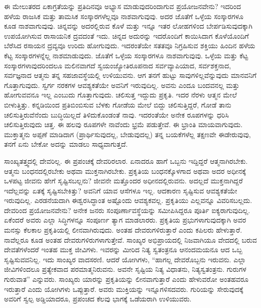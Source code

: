 ಈ ಮೇಲುತರದ ಏಕಾಗ್ರತೆಯನ್ನು ಪ್ರತಿದಿನವೂ ಅಭ್ಯಾಸ ಮಾಡುವುದರಿಂದಾಗುವ ಪ್ರಯೋಜನವೇನು? ಇದರಿಂದ ಹಳೆಯ ರಾಜಸಿಕ ಮತ್ತು ತಾಮಸಿಕ ಸಂಸ್ಕಾರಗಳೆಲ್ಲವೂ ನಾಶವಾಗುವುವು. ಅದರ ಜೊತೆಗೆ ಒಳ್ಳೆಯ ಸಂಸ್ಕಾರಗಳೂ ಕೂಡ ನಾಶವಾಗುವುವು. ಚಿನ್ನವನ್ನು ಅದರಲ್ಲಿರುವ ಕೊಳೆ ಮತ್ತು ಇನ್ನೂ ಇತರ ಲೋಹಗಳಿಂದ ಬೇರ್ಪಡಿಸುವುದಕ್ಕಾಗಿ ಉಪಯೋಗಿಸುವ ರಾಸಾಯನಿಕ ದ್ರವದಂತೆ ಇದು. ಚಿನ್ನದ ಅದುರನ್ನು ಇದರೊಂದಿಗೆ ಕಾಯಿಸಿದಾಗ ಕೊಳೆಯೊಂದಿಗೆ ಬೆರೆಸಿದ ರಸಾಯನ ದ್ರವ್ಯವೂ ಉರಿದು ಹೋಗುವುದು. ಇದರಂತೆಯೇ ಸತತವೂ ನಿಗ್ರಹಿಸುವ ಶಕ್ತಿಯು ಹಿಂದಿನ ಹಳೆಯ ಕೆಟ್ಟ ಸಂಸ್ಕಾರಗಳನ್ನೆಲ್ಲ ನಾಶಮಾಡುವುದು. ಜೊತೆಗೆ ಒಳ್ಳೆಯ ಸಂಸ್ಕಾರಗಳೂ ನಾಶವಾಗುವುವು. ಒಳ್ಳೆಯ ಮತ್ತು ಕೆಟ್ಟ ಸಂಸ್ಕಾರಗಳಾವುದರಿಂದಲೂ ಮಲಿನವಾಗದೆ ಸ್ವಯಂಜ್ಯೋತಿರೂಪನಾದ ಸರ್ವವ್ಯಾಪಿಯಾದ, ಸರ್ವಶಕ್ತನಾದ, ಸರ್ವಜ್ಞನಾದ ಆತ್ಮನು ತನ್ನ ಸಹಜಾವಸ್ಥೆಯಲ್ಲಿ ಉಳಿಯುವನು. ಆಗ ತನಗೆ ಹುಟ್ಟು ಸಾವುಗಳಿಲ್ಲವೆನ್ನುವುದು ಮಾನವನಿಗೆ ಗೊತ್ತಾಗುವುದು. ಸ್ವರ್ಗ ನರಕಗಳ ಆವಶ್ಯಕತೆಯೇ ಅವನಿಗೆ ಇರುವುದಿಲ್ಲ. ಅವನು ಎಂದೂ ಬಂದವನಲ್ಲ ಮತ್ತು ಹೋಗುವವನೂ ಇಲ್ಲ ಎಂಬುದು ಗೊತ್ತಾಗುವುದು. ಚಲಿಸುತ್ತ ಇದ್ದುದು ಪ್ರಕೃತಿ. ಇದರ ನೆರಳು ಆತ್ಮನ ಮೇಲೆ ಬೀಳುತ್ತಿತ್ತು. ಕನ್ನಡಿಯಿಂದ ಪ್ರತಿಬಿಂಬಿಸುವ ಬೆಳಕು ಗೋಡೆಯ ಮೇಲೆ ಬಿದ್ದು ಚಲಿಸುತ್ತಿದ್ದರೆ, ಗೋಡೆ ತಾನು ಚಲಿಸುತ್ತಿರುವೆನೆಂದು ಬುದ್ಧಿಯಿಲ್ಲದೆ ತಿಳಿದುಕೊಂಡಂತೆ ನಾವು. ಇದರಂತೆಯೇ ಅನೇಕ ರೂಪಗಳನ್ನು ಧರಿಸಿ ಚಲಿಸುತ್ತಿರುವುದು ಚಿತ್ತ. ಈ ಹಲವು ರೂಪಗಳೇ ನಾವೆಂದು ಭ್ರಮೆ ಪಡುತ್ತೇವೆ. ಈ ಭ್ರಾಂತಿ ಮಾಯವಾಗುವುದು. ಮುಕ್ತಾತ್ಮನು ಅಪ್ಪಣೆ ಮಾಡಿದಾಗ (ಪ್ರಾರ್ಥಿಸುವುದಲ್ಲ, ಬೇಡುವುದಲ್ಲ) ತನ್ನ ಬಯಕೆಗಳೆಲ್ಲ ತಕ್ಷಣವೇ ಈಡೇರುವುವು, ತನಗೆ ಏನು ಬೇಕೋ ಅದನ್ನು ಮಾಡಲು ಸಾಧ್ಯವಾಗುತ್ತದೆ. 

ಸಾಂಖ್ಯತತ್ತ್ವದಲ್ಲಿ ದೇವರಿಲ್ಲ. ಈ ಪ್ರಪಂಚಕ್ಕೆ ದೇವರಿರಲಾರ. ಏನಾದರೂ ಹಾಗೆ ಒಬ್ಬನು ಇದ್ದಿದ್ದರೆ ಆತ್ಮನಾಗಿರಬೇಕು. ಆತ್ಮನು ಬಂಧನದಲ್ಲಿರಬೇಕು ಅಥವಾ ಮುಕ್ತನಾಗಿರಬೇಕು. ಪ್ರಕೃತಿಯ ಬಂಧನಕ್ಕೊಳಗಾದ ಅಥವಾ ಅದರ ಅಧೀನಕ್ಕೆ ಒಳಪಟ್ಟ ಜೀವನು ಹೇಗೆ ಸೃಷ್ಟಿಸಬಲ್ಲನು? ಜೀವನೇ ಮತ್ತೊಂದರ ಅಧೀನದಲ್ಲಿರುವನು. ಅದಲ್ಲದೆ ಮುಕ್ತನಾಗಿದ್ದರೆ ಇದೆಲ್ಲವನ್ನು ಏತಕ್ಕೆ ಸೃಷ್ಟಿಸಬೇಕಿತ್ತು? ಅವನಿಗೆ ಯಾವ ಆಸೆಗಳೂ ಇಲ್ಲ. ಆದಕಾರಣ ಸೃಷ್ಟಿಸುವ ಆವಶ್ಯಕತೆಯೇ ಇರುವುದಿಲ್ಲ. ಎರಡನೆಯದಾಗಿ ಈಶ್ವರಸಿದ್ಧಾಂತ ಅಷ್ಟೊಂದು ಆವಶ್ಯಕವಲ್ಲ. ಪ್ರಕೃತಿಯು ಎಲ್ಲವನ್ನೂ ವಿವರಿಸಬಲ್ಲದು. ದೇವರಿಂದ ಪ್ರಯೋಜನವೇನು? ಅನೇಕ ಜನರು ಸಂಪೂರ್ಣಾವಸ್ಥೆಯನ್ನು ಸಮೀಪಿಸಿದ್ದರೂ ಪೂರ್ತಿ ಐಕ್ಯರಾಗುವುದಿಲ್ಲ. ಏಕೆಂದರೆ ಅವರು ಎಲ್ಲಾ ಸಿದ್ಧಿಗಳನ್ನೂ ಸಂಪೂರ್ಣ ತ್ಯಾಗ ಮಾಡಲಾರರು. ಪ್ರಕೃತಿಯ ಪ್ರಭುಗಳಾಗುವುದಕ್ಕಾಗಿ ಅವರ ಮನಸ್ಸು ಕೆಲಕಾಲ ಪ್ರಕೃತಿಯಲ್ಲಿ ಲೀನವಾಗಿರುವುದು. ಅಂತಹ ದೇವರುಗಳಿರುತ್ತಾರೆ ಎಂದು ಕಪಿಲರು ಹೇಳುತ್ತಾರೆ. ನಾವೆಲ್ಲರೂ ಕೂಡ ಅಂತಹ ದೇವರುಗಳಿರುಗಳಾಗುತ್ತೇವೆ. ಸಾಂಖ್ಯರ ಅಭಿಪ್ರಾಯದಲ್ಲಿ ನಿಜವಾಗಿಯೂ ವೇದದಲ್ಲಿ ಬರುವ ದೇವತೆಗಳೆಂದರೆ ಇಂತಹ ಮುಕ್ತ ಜೀವಿಗಳು. ಇವರನ್ನು ಮೀರಿದ ನಿತ್ಯ ಸ್ವತಂತ್ರನೂ ಆನಂದಮಯನೂ ಆದ ಒಬ್ಬ ಸೃಷ್ಟಿಸುವವನಿಲ್ಲ. ಇದು ಸಾಂಖ್ಯರ ವಾದಸರಣಿ. ಆದರೆ ಯೋಗಿಗಳು, “ಹಾಗಲ್ಲ ದೇವರೊಬ್ಬನು ಇರುವನು. ಎಲ್ಲಾ ಜೀವಿಗಳಿಂದಲೂ ಪ್ರತ್ಯೇಕವಾದ ಪರಮಾತ್ಮನಿರುವನು. ಅವನೇ ಸೃಷ್ಟಿಯ ನಿತ್ಯ ವಿಧಾತನು, ನಿತ್ಯಸ್ವತಂತ್ರನು. ಗುರುಗಳ ಗುರುವಾತ” ಎನ್ನುವರು. ಸಾಂಖ್ಯರು ಯಾರನ್ನು ಪ್ರಕೃತಿಯನ್ನು ಲೀನವಾಗುತ್ತಾರೆ ಎಂದು ಹೇಳುವರೋ ಅಂತಹವರೂ ಇರುತ್ತಾರೆ ಎಂದು ಯೋಗಿಗಳು ಒಪ್ಪುತ್ತಾರೆ. ಅವರು ಮುಕ್ತಿಯನ್ನು ಇನ್ನೂಗಳಿಸದವರು. ಗುರಿಯನ್ನು ಸೇರುವುದಕ್ಕೆ ಅವರಿಗೆ ಸ್ವಲ್ಪ ಅಡ್ಡಿಯಾದರೂ, ಪ್ರಪಂಚದ ಕೆಲವು ಭಾಗಕ್ಕೆ ಒಡೆಯರಾಗಿ ಉಳಿಯುವರು. 

